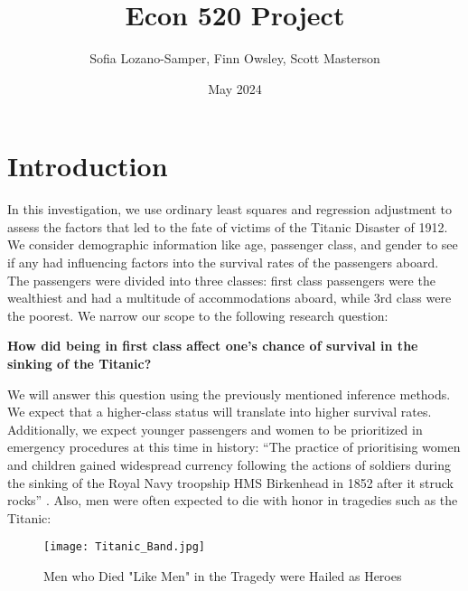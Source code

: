 \documentclass[12pt]{article}
\title{Econ 520 Project}
\author{Sofia Lozano-Samper, Finn Owsley, Scott Masterson}
\date{May 2024}
\begin{document}
\maketitle

\tableofcontents

\pagebreak

\section{Introduction}
\label{sec:Introduction}
\doublespacing
In this investigation, we use ordinary least squares and regression adjustment to assess the factors that led to the fate of victims of the Titanic Disaster of 1912. We consider demographic information like age, passenger class, and gender to see if any had influencing factors into the survival rates of the passengers aboard. The passengers were divided into three classes: first class passengers were the wealthiest and had a multitude of accommodations aboard, while 3rd class were the poorest. We narrow our scope to the following research question:

\textbf{How did being in first class affect one's chance of survival in the sinking of the Titanic?}

We will answer this question using the previously mentioned inference methods. We expect that a higher-class status will translate into higher survival rates. Additionally, we expect younger passengers and women to be prioritized in emergency procedures at this time in history: ``The practice of prioritising women and children gained widespread currency following the actions of soldiers during the sinking of the Royal Navy troopship HMS Birkenhead in 1852 after it struck rocks'' \cite{steamboatDisaster}. Also, men were often expected to die with honor in tragedies such as the Titanic:

\begin{figure}[H]
    \centering
    \texttt{[image: Titanic\_Band.jpg]}
    \caption{Men who Died "Like Men" in the Tragedy were Hailed as Heroes}
    \label{fig:tri_domain}
\end{figure}
\end{document}

